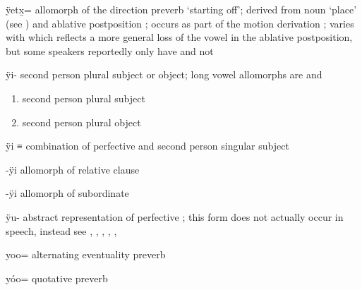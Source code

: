 \begin{morphdesc}[resume*=alphalist]
\item[ÿetx̱=]\label{m:ÿetx̱=}
	allomorph of the direction preverb  ‘starting off’;
	derived from noun  ‘place’ (see ) and ablative postposition ;
	occurs as part of the motion derivation
		;
	varies with  which reflects a more general loss of the vowel in the ablative
		postposition, but some speakers reportedly only have  and not 

\item[ÿi-]\label{m:ÿi-}
	second person plural subject or object; long vowel allomorphs are  and 
	\begin{enumerate}
	\item	second person plural subject
	\item	second person plural object
	\end{enumerate}

\item[ÿi]
	≡ 
	combination of perfective  and
		second person singular subject 

\item[-ÿi]\label{m:-ÿi-rel}
	allomorph of relative clause 

\item[-ÿi]\label{m:-ÿi-sub}
	allomorph of subordinate 

\item[ÿu-]\label{m:ÿu-}
	abstract representation of perfective ;
	this form does not actually occur in speech, instead see
		, , ,  , , 

\item[yoo=]
	alternating eventuality preverb

\item[yóo=]
	quotative preverb

\end{morphdesc}
